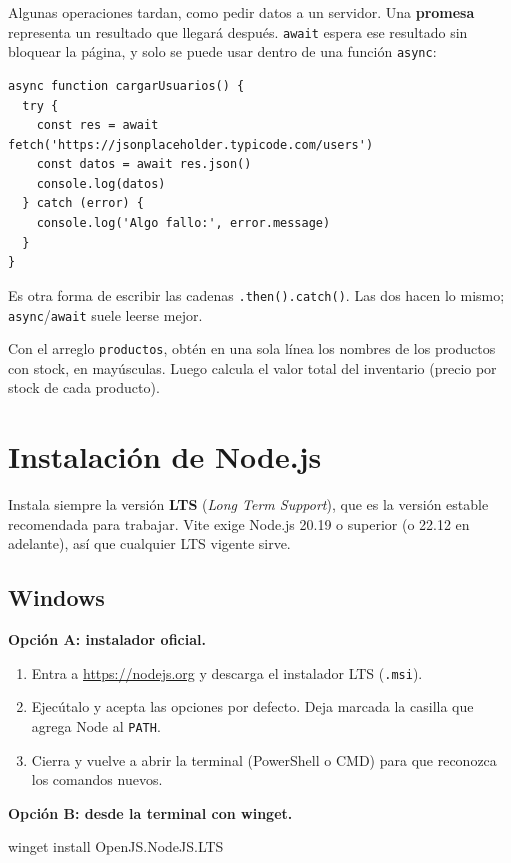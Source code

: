 \documentclass[11pt,a4paper]{article}
\newcommand{\cmd}[1]{\texttt{\color{reactdark}#1}}
\begin{document}
Algunas operaciones tardan, como pedir datos a un servidor. Una \textbf{promesa} representa un resultado que llegará después. \cmd{await} espera ese resultado sin bloquear la página, y solo se puede usar dentro de una función \cmd{async}:
\begin{lstlisting}[language=JSX]
async function cargarUsuarios() {
  try {
    const res = await fetch('https://jsonplaceholder.typicode.com/users')
    const datos = await res.json()
    console.log(datos)
  } catch (error) {
    console.log('Algo fallo:', error.message)
  }
}
\end{lstlisting}

Es otra forma de escribir las cadenas \cmd{.then().catch()}. Las dos hacen lo mismo; \cmd{async}/\cmd{await} suele leerse mejor.

\begin{ejercicio}[de JavaScript]
Con el arreglo \cmd{productos}, obtén en una sola línea los nombres de los productos con stock, en mayúsculas. Luego calcula el valor total del inventario (precio por stock de cada producto).
\end{ejercicio}


\section{Instalación de Node.js}

Instala siempre la versión \textbf{LTS} (\emph{Long Term Support}), que es la versión estable recomendada para trabajar. Vite exige Node.js 20.19 o superior (o 22.12 en adelante), así que cualquier LTS vigente sirve.

\subsection{Windows}

\textbf{Opción A: instalador oficial.}
\begin{enumerate}[leftmargin=*]
  \item Entra a \url{https://nodejs.org} y descarga el instalador LTS (\cmd{.msi}).
  \item Ejecútalo y acepta las opciones por defecto. Deja marcada la casilla que agrega Node al \cmd{PATH}.
  \item Cierra y vuelve a abrir la terminal (PowerShell o CMD) para que reconozca los comandos nuevos.
\end{enumerate}

\textbf{Opción B: desde la terminal con winget.}
\begin{terminal}
winget install OpenJS.NodeJS.LTS
\end{terminal}
\end{document}

